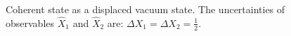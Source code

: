 \begin{figure}
\centering



\caption{Coherent state as a displaced vacuum state. The uncertainties of observables $\hat{X}_1$ and $\hat{X}_2$ are: $\Delta X_1 = \Delta X_2 = \frac{1}{2}$.} 
\label{figPart3Squeezed_6}
\end{figure}